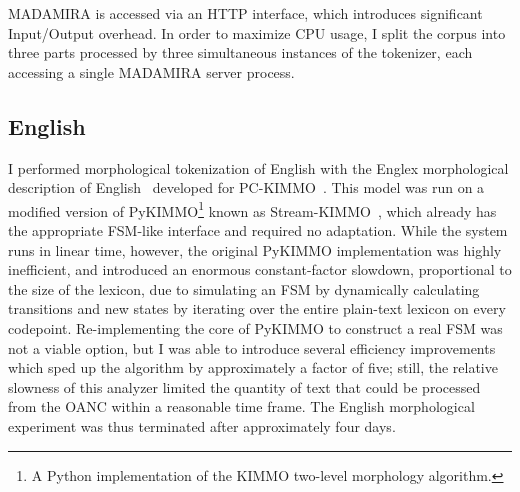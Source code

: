 MADAMIRA is accessed via an HTTP interface, which introduces significant Input/Output overhead. In order to maximize CPU usage, I split the corpus into three parts processed by three simultaneous instances of the tokenizer, each accessing a single MADAMIRA server process.

\subsection{English}
I performed morphological tokenization of English with the Englex morphological description of English~\cite{antworthenglex} developed for PC-KIMMO~\cite{koskenniemi84}. This model was run on a modified version of PyKIMMO\footnote{A Python implementation of the KIMMO two-level morphology algorithm.} known as Stream-KIMMO~\cite{kearsley13}, which already has the appropriate FSM-like interface and required no adaptation. While the system runs in linear time, however, the original PyKIMMO implementation was highly inefficient, and introduced an enormous constant-factor slowdown, proportional to the size of the lexicon, due to simulating an FSM by dynamically calculating transitions and new states by iterating over the entire plain-text lexicon on every codepoint. Re-implementing the core of PyKIMMO to construct a real FSM was not a viable option, but I was able to introduce several efficiency improvements which sped up the algorithm by approximately a factor of five; still, the relative slowness of this analyzer limited the quantity of text that could be processed from the OANC within a reasonable time frame. The English morphological experiment was thus terminated after approximately four days.

